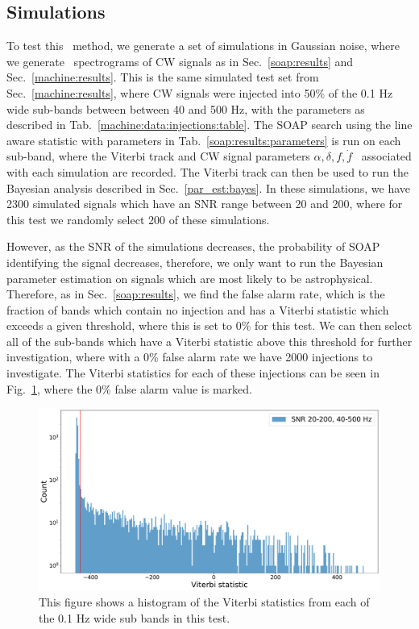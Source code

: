 %
%
\subsection{\label{par_est:results:simulations}Simulations}
%
%
To test this~ method, we generate a
set of simulations in Gaussian noise, where we generate~ spectrograms of \gls{CW} signals as in Sec.~\ref{soap:results} and
Sec.~\ref{machine:results}.  This is the same simulated test set from
Sec.~\ref{machine:results}, where \gls{CW} signals were injected into 50\% of
the 0.1 Hz wide sub-bands between between 40 and 500 Hz, with the parameters as
described in Tab.~\ref{machine:data:injections:table}.  The SOAP search using
the line aware statistic with parameters in Tab.~\ref{soap:results:parameters}
is run on each sub-band, where the Viterbi track and \gls{CW} signal parameters
$\alpha, \delta, f, \dot{f}$~ associated with each
simulation are recorded.  The Viterbi track can then be used to run the
Bayesian analysis described in Sec.~\ref{par_est:bayes}.  In these simulations,
we have 2300 simulated signals which have an \gls{SNR} range between 20 and
200, where for this test we randomly select 200 of these simulations.

\if
However, as the \gls{SNR} of the simulations decreases, the probability of SOAP identifying the signal decreases, therefore, we only want to run the Bayesian parameter estimation on signals which are most likely to be astrophysical.
Therefore, as in Sec.~\ref{soap:results}, we find the false alarm rate, which is the fraction of bands which contain no injection and has a Viterbi statistic which exceeds a given threshold, where this is set to 0\% for this test.
We can then select all of the sub-bands which have a Viterbi statistic above this threshold for further investigation, where with a 0\% false alarm rate we have 2000  injections to investigate.
The Viterbi statistics for each of these injections can be seen in Fig.~\ref{par_est:results:all_viterbi}, where the 0\% false alarm value is marked.
%
\begin{figure}
    \centering
    \includegraphics[width=\linewidth]{C5_parameter/viterbi_hist.pdf}
    \caption[All Viterbi statistics]{This figure shows a histogram of the Viterbi statistics from each of the 0.1 Hz wide sub bands in this test. }
    \label{par_est:results:all_viterbi}
\end{figure}
\fi


